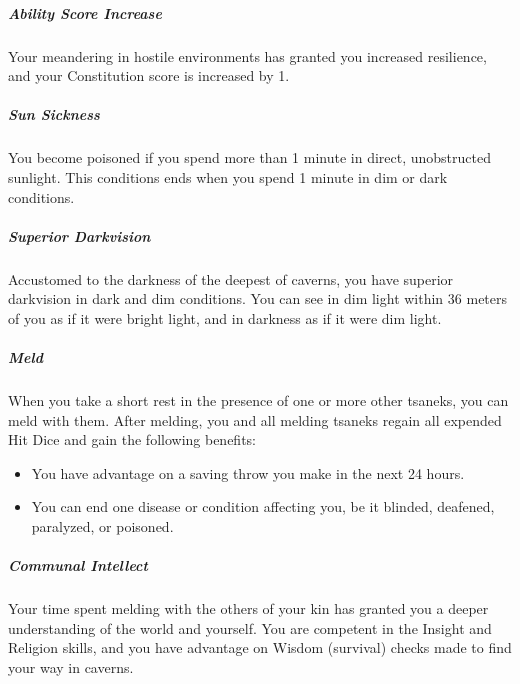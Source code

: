     \subparagraph{Ability Score Increase} Your meandering in hostile environments has granted you increased resilience, and your Constitution score is increased by 1.

    \subparagraph{Sun Sickness} You become poisoned if you spend more than 1 minute in direct, unobstructed sunlight.
    This conditions ends when you spend 1 minute in dim or dark conditions.

    \subparagraph{Superior Darkvision} Accustomed to the darkness of the deepest of caverns, you have superior darkvision in dark and dim conditions.
    You can see in dim light within 36 meters of you as if it were bright light, and in darkness as if it were dim light.

    \subparagraph{Meld} When you take a short rest in the presence of one or more other tsaneks, you can meld with them.
    After melding, you and all melding tsaneks regain all expended Hit Dice and gain the following benefits:
    \begin{itemize}
        \item You have advantage on a saving throw you make in the next 24 hours.
        \item You can end one disease or condition affecting you, be it blinded, deafened, paralyzed, or poisoned.
    \end{itemize}

    \subparagraph{Communal Intellect} Your time spent melding with the others of your kin has granted you a deeper understanding of the world and yourself.
    You are competent in the Insight and Religion skills, and you have advantage on Wisdom (survival) checks made to find your way in caverns.

\newpage
